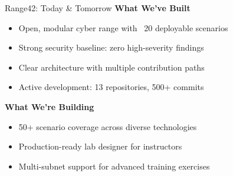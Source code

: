 \documentclass[aspectratio=169]{beamer}
\begin{document}
\begin{frame}{Range42: Today \& Tomorrow \; \faCheckCircle}
  \textbf{What We've Built}
  \begin{itemize}
    \item Open, modular cyber range with ~20 deployable scenarios
    \item Strong security baseline: zero high-severity findings
    \item Clear architecture with multiple contribution paths
    \item Active development: 13 repositories, 500+ commits
  \end{itemize}
  \vspace{3mm}
  \textbf{What We're Building}
  \begin{itemize}
    \item 50+ scenario coverage across diverse technologies
    \item Production-ready lab designer for instructors
    \item Multi-subnet support for advanced training exercises
  \end{itemize}
\end{frame}
\end{document}
